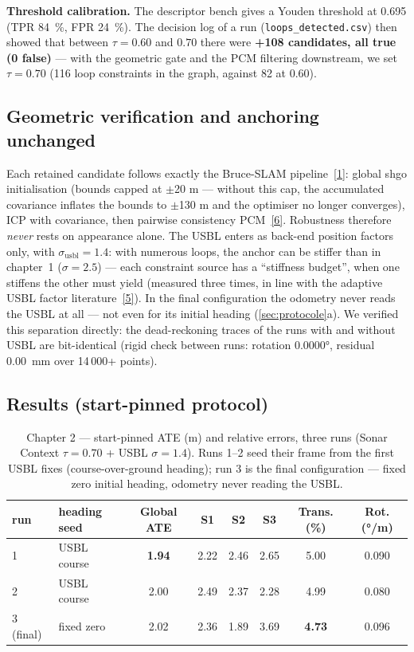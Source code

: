 \textbf{Threshold calibration.} The descriptor bench gives a Youden threshold at
0.695 (TPR 84~\%, FPR 24~\%). The decision log of a run
(\texttt{loops\_detected.csv}) then showed that between $\tau = 0.60$ and $0.70$
there were \textbf{+108 candidates, all true (0 false)} — with the geometric gate and
the PCM filtering downstream, we set $\tau = 0.70$ (116 loop constraints in the
graph, against 82 at 0.60).

\subsection{Geometric verification and anchoring unchanged}

Each retained candidate follows exactly the Bruce-SLAM pipeline~\hyperref[bib:bruceslam]{[1]}: global shgo
initialisation (bounds capped at $\pm$20 m — without this cap, the accumulated
covariance inflates the bounds to $\pm$130 m and the optimiser no longer converges),
ICP with covariance, then pairwise consistency PCM~\hyperref[bib:pcm]{[6]}. Robustness therefore
\emph{never} rests on appearance alone. The USBL enters as back-end position factors
only, with $\sigma_{\text{usbl}} = 1.4$: with numerous loops, the anchor can be
stiffer than in chapter~1 ($\sigma = 2.5$) — each constraint source has a
``stiffness budget'', when one stiffens the other must yield (measured three times,
in line with the adaptive USBL factor literature~\hyperref[bib:insusbldvl]{[5]}). In the final configuration
the odometry never reads the USBL at all — not even for its initial heading
(\autoref{sec:protocole}a). We verified this separation directly: the dead-reckoning
traces of the runs with and without USBL are bit-identical (rigid check between
runs: rotation 0.0000°, residual 0.00~mm over 14\,000+ points).

\subsection{Results (start-pinned protocol)}
\label{sec:chap2-res}

\begin{table}[H]
\centering
\caption{Chapter 2 — start-pinned ATE (m) and relative errors, three runs
(Sonar Context $\tau = 0.70$ + USBL $\sigma = 1.4$). Runs 1--2 seed their frame
from the first USBL fixes (course-over-ground heading); run 3 is the final
configuration — fixed zero initial heading, odometry never reading the USBL.}
\label{tab:chap2}
\begin{tabular}{llcccccc}
\hline
run & heading seed & Global ATE & S1 & S2 & S3 & Trans. (\%) & Rot. (°/m) \\
\hline
1 & USBL course & \textbf{1.94} & 2.22 & 2.46 & 2.65 & 5.00 & 0.090 \\
2 & USBL course & 2.00 & 2.49 & 2.37 & 2.28 & 4.99 & 0.080 \\
3 (final) & fixed zero & 2.02 & 2.36 & 1.89 & 3.69 & \textbf{4.73} & 0.096 \\
\hline
\end{tabular}
\end{table}

